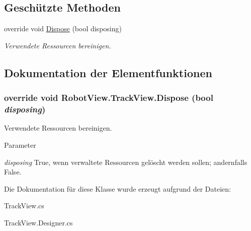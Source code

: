 \subsection*{Geschützte Methoden}
\begin{DoxyCompactItemize}
\item 
override void \hyperlink{class_robot_view_1_1_track_view_a7254c3b00294c99a3c8c482f744c47c0}{Dispose} (bool disposing)
\begin{DoxyCompactList}\small\item\em Verwendete Ressourcen bereinigen. \item\end{DoxyCompactList}\end{DoxyCompactItemize}


\subsection{Dokumentation der Elementfunktionen}
\hypertarget{class_robot_view_1_1_track_view_a7254c3b00294c99a3c8c482f744c47c0}{
\subsubsection[{Dispose}]{\setlength{\rightskip}{0pt plus 5cm}override void RobotView.TrackView.Dispose (bool {\em disposing})}}
\label{class_robot_view_1_1_track_view_a7254c3b00294c99a3c8c482f744c47c0}


Verwendete Ressourcen bereinigen. 


\begin{DoxyParams}{Parameter}
\item[{\em disposing}]True, wenn verwaltete Ressourcen gelöscht werden sollen; andernfalls False.\end{DoxyParams}


Die Dokumentation für diese Klasse wurde erzeugt aufgrund der Dateien:\begin{DoxyCompactItemize}
\item 
TrackView.cs\item 
TrackView.Designer.cs\end{DoxyCompactItemize}
